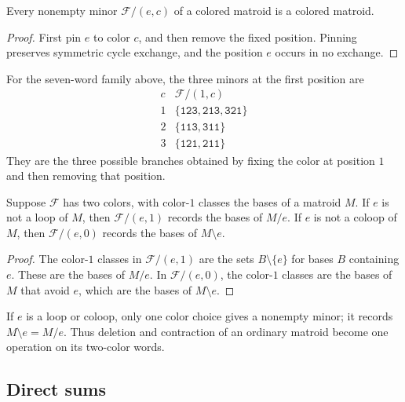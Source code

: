 \begin{proposition}
Every nonempty minor $\mathcal F/(e,c)$ of a colored matroid is a colored
matroid.
\end{proposition}

\begin{proof}
First pin $e$ to color $c$, and then remove the fixed position. Pinning
preserves symmetric cycle exchange, and the position $e$ occurs in no exchange.
\end{proof}

\begin{example}
For the seven-word family above, the three minors at the first position are
\[
\begin{array}{c|c}
c&\mathcal F/(1,c)\\ \hline
1&\{\mathtt{123},\mathtt{213},\mathtt{321}\}\\
2&\{\mathtt{113},\mathtt{311}\}\\
3&\{\mathtt{121},\mathtt{211}\}
\end{array}
\]
They are the three possible branches obtained by fixing the color at position
$1$ and then removing that position.
\end{example}

\begin{proposition}
Suppose $\mathcal F$ has two colors, with color-$1$ classes the bases of a
matroid $M$. If $e$ is not a loop of $M$, then
$\mathcal F/(e,1)$ records the bases of $M/e$. If $e$ is not a coloop of
$M$, then $\mathcal F/(e,0)$ records the bases of $M\setminus e$.
\end{proposition}

\begin{proof}
The color-$1$ classes in $\mathcal F/(e,1)$ are the sets
$B\setminus\{e\}$ for bases $B$ containing $e$. These are the bases of
$M/e$. In $\mathcal F/(e,0)$, the color-$1$ classes are the bases of $M$
that avoid $e$, which are the bases of $M\setminus e$.
\end{proof}

If $e$ is a loop or coloop, only one color choice gives a nonempty minor;
it records $M\setminus e=M/e$.
Thus deletion and contraction of an ordinary matroid become one operation on
its two-color words.

\subsection[directSums]{Direct sums}

